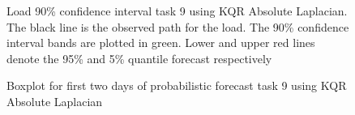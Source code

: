 \begin{figure}[!ht]
    \centering
    \caption[Prediction load track task 9, Absolute Laplacian kernel]{Load 90\% confidence interval task 9 using KQR Absolute Laplacian. The black line is the observed path for the load. The 90\% confidence interval bands are plotted in green. Lower and upper red lines denote the 95\% and 5\% quantile forecast respectively}
    \label{fig:load_task_9}
\end{figure}


\begin{figure}[!ht]
    \centering
    \caption{Boxplot for first two days of probabilistic forecast task 9 using KQR Absolute Laplacian}
    \label{fig:boxplot_load_task_9}
\end{figure}



